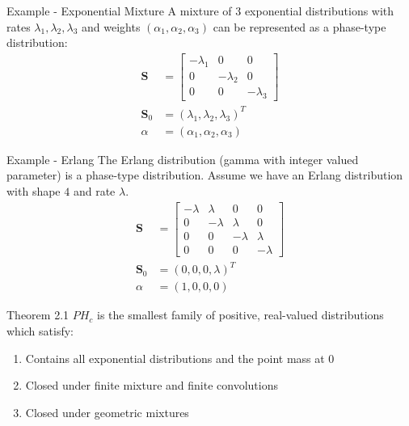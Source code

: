 \documentclass{beamer}
\theoremstyle{definition}
\begin{document}
\begin{frame}{Example - Exponential Mixture}
A mixture of 3 exponential distributions with rates $\lambda_1, \lambda_2, \lambda_3$ and weights $(\alpha_1, \alpha_2, \alpha_3)$ can be represented as a phase-type distribution:
\begin{align*}
    \mathbf S &= \begin{bmatrix}
        -\lambda_1 & 0 & 0\\
        0 & - \lambda_2 & 0\\
        0 & 0 & - \lambda_3
        \end{bmatrix}\\
    \mathbf{S}_0 &= (\lambda_1, \lambda_2, \lambda_3)^T\\
    \alpha &= (\alpha_1, \alpha_2, \alpha_3)
\end{align*}
\end{frame}

\begin{frame}{Example - Erlang}
The Erlang distribution (gamma with integer valued parameter) is a phase-type distribution.
Assume we have an Erlang distribution with shape $4$ and rate $\lambda$.
\begin{align*}
    \mathbf S &= \begin{bmatrix}
        -\lambda & \lambda & 0 & 0\\
        0 & - \lambda & \lambda & 0\\
        0 & 0 & -\lambda & \lambda\\
        0 & 0 & 0 & -\lambda
        \end{bmatrix}\\
    \mathbf{S}_0 &= (0, 0, 0, \lambda)^T\\
    \alpha &= (1,0,0,0)
\end{align*}
\end{frame}

\begin{frame}
Theorem 2.1 \cite{maier1992}
$PH_c$ is the smallest family of positive, real-valued distributions which satisfy:
\begin{enumerate}
    \item Contains all exponential distributions and the point mass at 0
    \item Closed under finite mixture and finite convolutions
    \item Closed under geometric mixtures
\end{enumerate}
\end{frame}
\end{document}
